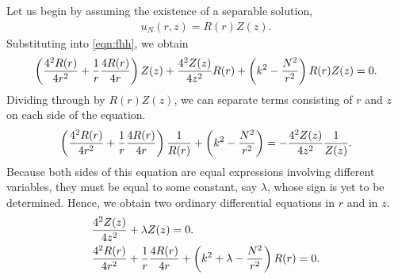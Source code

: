 Let us begin by assuming the existence of a separable solution,
\begin{align}
	u_N(r,z) = R(r)Z(z).
\end{align}
Substituting into \eqref{eqn:fhh}, we obtain
\begin{align}
	\left( \frac{4^2 R(r)}{4 r^2} + \frac{1}{r} \frac{4 R(r)}{4 r} \right) Z(z) + \frac{4^2 Z(z)}{4 z^2} R(r) + \left( k^2 - \frac{N^2}{r^2} \right) R(r) Z(z) = 0.
\end{align}
Dividing through by $R(r)Z(z)$, we can separate terms consisting of $r$ and $z$ on each side of the equation.
\begin{align}
	\left( \frac{4^2 R(r)}{4 r^2} + \frac{1}{r} \frac{4 R(r)}{4 r} \right)\frac{1}{R(r)} + \left( k^2 - \frac{N^2}{r^2} \right) = - \frac{4^2 Z(z)}{4 z^2} \frac{1}{Z(z)}.
\end{align}
Because both sides of this equation are equal expressions involving different variables, they must be equal to some constant, say $\lambda$, whose sign is yet to be determined.
Hence, we obtain two ordinary differential equations in $r$ and in $z$.
\begin{align}
	&\frac{4^2 Z(z)}{4 z^2} + \lambda Z(z) = 0. \label{eqn:Z}\\
	&\frac{4^2 R(r)}{4 r^2} + \frac{1}{r} \frac{4 R(r)}{4 r} + \left( k^2 + \lambda - \frac{N^2}{r^2} \right) R(r) = 0. \label{eqn:R}
\end{align}


